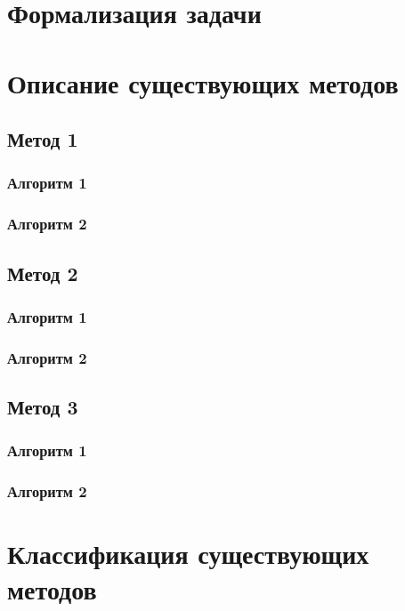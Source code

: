 \section{Формализация задачи}


\section{Описание существующих методов}


\subsection{Метод 1}

\subsubsection{Алгоритм 1}

\subsubsection{Алгоритм 2}

\subsection{Метод 2}

\subsubsection{Алгоритм 1}

\subsubsection{Алгоритм 2}

\subsection{Метод 3}

\subsubsection{Алгоритм 1}

\subsubsection{Алгоритм 2}

\section{Классификация существующих методов}

